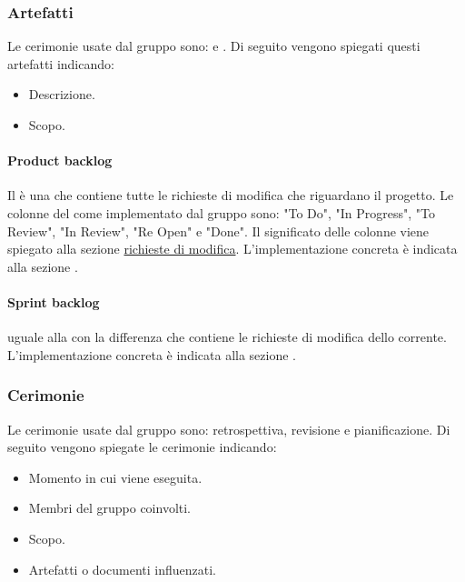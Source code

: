 \subsubsection{Artefatti}
Le cerimonie usate dal gruppo sono:  e . 
Di seguito vengono spiegati questi artefatti indicando:
\begin{itemize}
    \item Descrizione.
    \item Scopo.
\end{itemize}

\paragraph{Product backlog}
Il  è una  che contiene tutte le richieste di modifica che riguardano il progetto.
Le colonne del  come implementato dal gruppo sono: "To Do", "In Progress", "To Review", "In Review", "Re Open" e "Done".
Il significato delle colonne viene spiegato alla sezione \hyperref[par:ciclo_vita_richieste_di_modifica]{ richieste di modifica}.
L'implementazione concreta è indicata alla sezione \hyperref[subpar:project]{}.

\paragraph{Sprint backlog}
 uguale alla  con la differenza che contiene le richieste di modifica dello  corrente.
L'implementazione concreta è indicata alla sezione \hyperref[subpar:project]{}.

\subsubsection{Cerimonie}
Le cerimonie usate dal gruppo sono: retrospettiva, revisione e pianificazione. 
Di seguito vengono spiegate le cerimonie indicando:
\begin{itemize}
    \item Momento in cui viene eseguita.
    \item Membri del gruppo coinvolti.
    \item Scopo.
    \item Artefatti o documenti influenzati.
\end{itemize}

